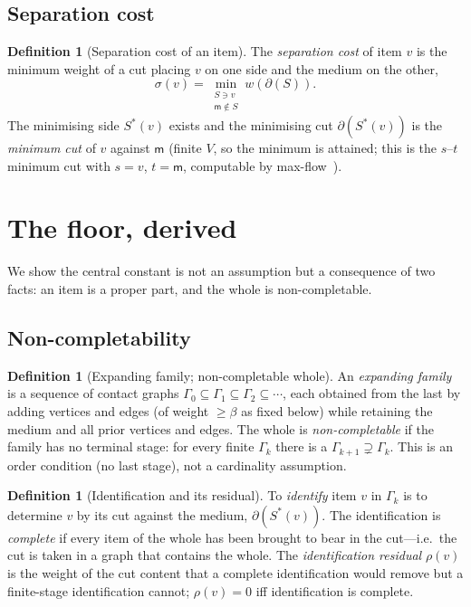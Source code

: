 \documentclass[11pt,twocolumn,a4paper]{article}
\theoremstyle{thmstyle}
\theoremstyle{definition}
\newtheorem{definition}[theorem]{Definition}
\theoremstyle{remark}
\newcommand{\Gph}{\Gamma}
\newcommand{\V}{V}
\newcommand{\wt}{w}
\newcommand{\med}{\mathsf{m}}            %
\newcommand{\flo}{\beta}                 %
\newcommand{\cut}{\partial}              %
\newcommand{\res}{\rho}                  %
\newcommand{\str}{\sigma}                %
\begin{document}
\subsection{Separation cost}

\begin{definition}[Separation cost of an item]
\label{def:sepcost}
The \emph{separation cost} of item $v$ is the minimum weight of a cut
placing $v$ on one side and the medium on the other,
\[
\str(v)=\min_{\substack{S\ni v\\ \med\notin S}}\wt(\cut(S)).
\]
The minimising side $S^{\ast}(v)$ exists and the minimising cut
$\cut(S^{\ast}(v))$ is the \emph{minimum cut} of $v$ against $\med$
(finite $\V$, so the minimum is attained; this is the $s$--$t$ minimum cut
with $s=v$, $t=\med$, computable by max-flow~\citep{fordfulkerson1956,%
mengertheorem}).
\end{definition}

\section{The floor, derived}
\label{sec:floor}

We show the central constant is not an assumption but a consequence of two
facts: an item is a proper part, and the whole is non-completable.

\subsection{Non-completability}

\begin{definition}[Expanding family; non-completable whole]
\label{def:noncompletable}
An \emph{expanding family} is a sequence of contact graphs
$\Gph_0\subseteq\Gph_1\subseteq\Gph_2\subseteq\cdots$, each obtained from
the last by adding vertices and edges (of weight $\ge\flo$ as fixed below)
while retaining the medium and all prior vertices and edges. The whole is
\emph{non-completable} if the family has no terminal stage: for every
finite $\Gph_k$ there is a $\Gph_{k+1}\supsetneq\Gph_k$. This is an order
condition (no last stage), not a cardinality assumption.
\end{definition}

\begin{definition}[Identification and its residual]
\label{def:identification}
To \emph{identify} item $v$ in $\Gph_k$ is to determine $v$ by its cut
against the medium, $\cut(S^{\ast}(v))$. The identification is
\emph{complete} if every item of the whole has been brought to bear in the
cut---i.e.\ the cut is taken in a graph that contains the whole. The
\emph{identification residual} $\res(v)$ is the weight of the cut content
that a complete identification would remove but a finite-stage
identification cannot; $\res(v)=0$ iff identification is complete.
\end{definition}
\end{document}
